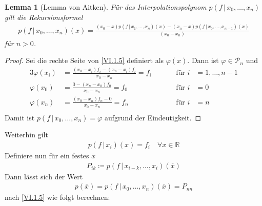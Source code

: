 \documentclass[ngerman,fontsize=11pt, paper=a4, parskip=half, titlepage=true, toc=bib]{scrbook}
\theoremstyle{definition}
\theoremstyle{plain}
\newtheorem{Lem}[Def]{Lemma}		%
\newcommand{\R}{\mathds{R}}
\newcommand{\subsectione}[1]{\addtocounter{Def}{1}\subsection{#1}}
\newenvironment{Leme}[1][]{ %
  \begin{Lem}[#1] }
  {\end{Lem}
  	\addtocounter{subsection}{1}}
\begin{document}
\begin{Leme}[Lemma von Aitken]
  Für das Interpolationspolynom $p(f\,|\,x_0, \dots, x_n)$ gilt die 
  Rekursionsformel
  \begin{gather}
    p(f\,|\,x_0, \dots, x_n) (x) = \frac{(x_0-x)p(f\,|\,x_1,\dots, x_n)(x) -
      (x_n-x)p(f\,|\,x_0,\dots, x_{n-1})(x)}
    {(x_0-x_n)}
    \label{VI.1.5}
  \end{gather}
  für $n>0$.	
\end{Leme}

\begin{proof}
  Sei die rechte Seite von \eqref{VI.1.5} definiert als $\varphi(x)$.
  Dann ist $\varphi\in\mathcal{P}_n$ und 
  \begin{alignat*}{3}
    \varphi(x_i) &= \frac{(x_0-x_i)f_i-(x_n-x_i)f_i}{x_0-x_n}= f_i\quad
    &&&\text{für } i&=1,\dots , n-1\\
    \varphi(x_0) &= \frac{0-(x_n-x_0)f_0}{x_0-x_n} = f_0
    &&&\text{für } i&=0\\
    \varphi(x_n) &= \frac{(x_0-x_n)f_n-0}{x_0-x_n} = f_n
    &&&\text{für } i&=n\\
  \end{alignat*}
  Damit ist $p(f\,|\,x_0, \dots, x_n) = \varphi$ aufgrund der Eindeutigkeit.
\end{proof}



Weiterhin gilt
\begin{gather}
  p(f\,|\, x_i)(x) = f_i\quad \forall x\in\R
  \label{VI.1.6}
\end{gather}
Definiere nun für ein festes $\overline{x}$
\begin{gather}
  P_{ik} \coloneqq p(f\,|\, x_{i-k}, \dots, x_{i})(\overline{x})
  \label{VI.1.7}
\end{gather}
Dann lässt sich der Wert
\begin{gather*}
  p(\overline{x}) = p(f\,|\, x_0, \dots , x_n)(\overline{x})= P_{nn}
\end{gather*}
nach \eqref{VI.1.5} wie folgt berechnen:
\end{document}
